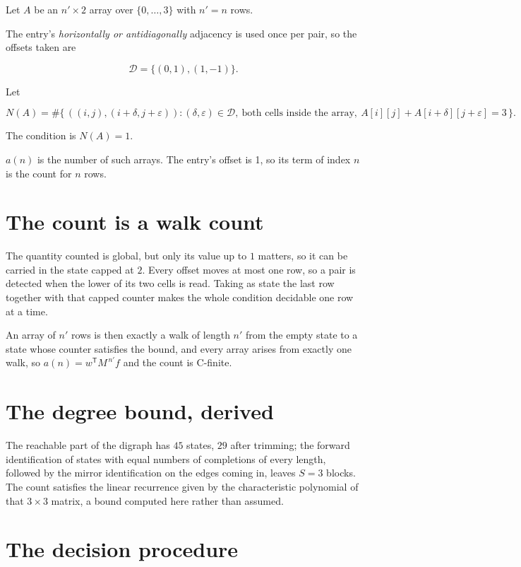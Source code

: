 \documentclass[11pt]{article}
\theoremstyle{definition}
\begin{document}
Let $A$ be an $n' \times 2$ array over $\{0,\dots,3\}$ with $n' = n$ rows.

The entry's {\itshape horizontally or antidiagonally} adjacency is used once per pair, so the offsets taken are

\[\mathcal{D} = \{(0,1), (1,-1)\}.\]

Let

\[N(A) = \#\bigl\{\,((i,j),(i{+}\delta,j{+}\varepsilon)) : (\delta,\varepsilon) \in \mathcal{D},\ \text{both cells inside the array},\ A[i][j] + A[i{+}\delta][j{+}\varepsilon] = 3\,\bigr\}.\]

The condition is $N(A) = 1$.

$a(n)$ is the number of such arrays. The entry's offset is 1, so its term of index $n$ is the count for $n$ rows.

\section{The count is a walk count}

The quantity counted is global, but only its value up to $1$ matters, so it can be carried in the state capped at $2$. Every offset moves at most one row, so a pair is detected when the lower of its two cells is read. Taking as state the last row together with that capped counter makes the whole condition decidable one row at a time.

An array of $n'$ rows is then exactly a walk of length $n'$ from the empty state to a state whose counter satisfies the bound, and every array arises from exactly one walk, so $a(n) = w^{\mathsf T}M^{\,n'}f$ and the count is C-finite.

\section{The degree bound, derived}

The reachable part of the digraph has $45$ states, $29$ after trimming; the forward identification of states with equal numbers of completions of every length, followed by the mirror identification on the edges coming in, leaves $S = 3$ blocks. The count satisfies the linear recurrence given by the characteristic polynomial of that $3\times3$ matrix, a bound computed here rather than assumed.

\section{The decision procedure}
\end{document}
